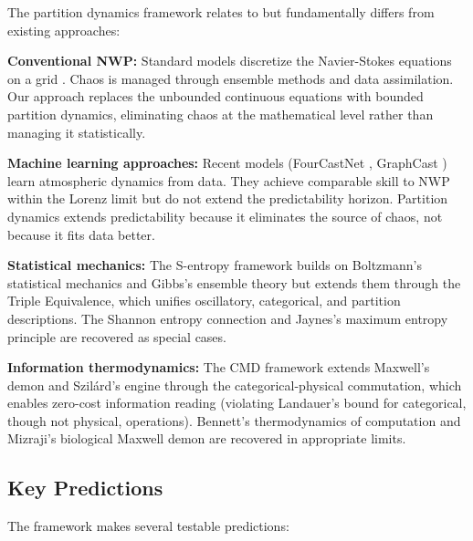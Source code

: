 \documentclass[twocolumn,10pt]{article}
\theoremstyle{definition}
\begin{document}
The partition dynamics framework relates to but fundamentally differs from existing approaches:

\textbf{Conventional NWP:} Standard models discretize the Navier-Stokes equations on a grid \citep{Bauer2015, Bauer2021}. Chaos is managed through ensemble methods \citep{Buizza1999} and data assimilation. Our approach replaces the unbounded continuous equations with bounded partition dynamics, eliminating chaos at the mathematical level rather than managing it statistically.

\textbf{Machine learning approaches:} Recent models (FourCastNet \citep{Pathak2022}, GraphCast \citep{Lam2023}) learn atmospheric dynamics from data. They achieve comparable skill to NWP within the Lorenz limit but do not extend the predictability horizon. Partition dynamics extends predictability because it eliminates the source of chaos, not because it fits data better.

\textbf{Statistical mechanics:} The S-entropy framework builds on Boltzmann's statistical mechanics \citep{Boltzmann1896} and Gibbs's ensemble theory \citep{Gibbs1902} but extends them through the Triple Equivalence, which unifies oscillatory, categorical, and partition descriptions. The Shannon entropy connection \citep{Shannon1948} and Jaynes's maximum entropy principle \citep{Jaynes1957} are recovered as special cases.

\textbf{Information thermodynamics:} The CMD framework extends Maxwell's demon \citep{Maxwell1871} and Szil\'ard's engine \citep{Szilard1929} through the categorical-physical commutation, which enables zero-cost information reading (violating Landauer's bound \citep{Landauer1961} for categorical, though not physical, operations). Bennett's thermodynamics of computation \citep{Bennett1982} and Mizraji's biological Maxwell demon \citep{Mizraji2021} are recovered in appropriate limits.

\subsection{Key Predictions}

The framework makes several testable predictions:
\end{document}
